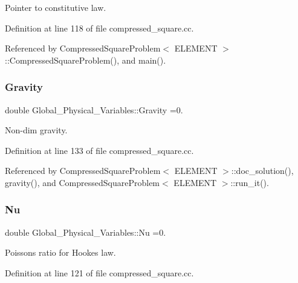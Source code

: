 Pointer to constitutive law. 



Definition at line 118 of file compressed\+\_\+square.\+cc.



Referenced by Compressed\+Square\+Problem$<$ E\+L\+E\+M\+E\+N\+T $>$\+::\+Compressed\+Square\+Problem(), and main().

\mbox{\label{namespaceGlobal__Physical__Variables_a8b80d3e8d63b8d0a0ed435a2dd7fe2ad}} 
\subsubsection{\texorpdfstring{Gravity}{Gravity}}
{\footnotesize\ttfamily double Global\+\_\+\+Physical\+\_\+\+Variables\+::\+Gravity =0.}



Non-\/dim gravity. 



Definition at line 133 of file compressed\+\_\+square.\+cc.



Referenced by Compressed\+Square\+Problem$<$ E\+L\+E\+M\+E\+N\+T $>$\+::doc\+\_\+solution(), gravity(), and Compressed\+Square\+Problem$<$ E\+L\+E\+M\+E\+N\+T $>$\+::run\+\_\+it().

\mbox{\label{namespaceGlobal__Physical__Variables_a3962c36313826b19f216f6bbbdd6a477}} 
\subsubsection{\texorpdfstring{Nu}{Nu}}
{\footnotesize\ttfamily double Global\+\_\+\+Physical\+\_\+\+Variables\+::\+Nu =0.}



Poisson\textquotesingle{}s ratio for Hooke\textquotesingle{}s law. 



Definition at line 121 of file compressed\+\_\+square.\+cc.



